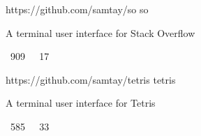 \vspace{0.25em}
\begin{cvprojects}
  \cvproject
    {https://github.com/samtay/so}
    {so}
    {\begin{cvitems}
        \item A terminal user interface for Stack Overflow
        \item {\color{graytext} \faStarO \, 909 $\;$ \faCodeFork \, 17}
     \end{cvitems}}
  \cvproject
    {https://github.com/samtay/tetris}
    {tetris}
    {\begin{cvitems}
        \item A terminal user interface for Tetris
        \item {\color{graytext} \faStarO \, 585 $\;$ \faCodeFork \, 33}
     \end{cvitems}}
\end{cvprojects}
